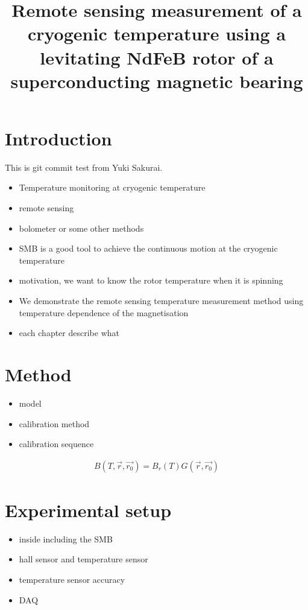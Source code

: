 \documentclass[12pt]{amsart}
\title{Remote sensing measurement of a cryogenic temperature using a levitating NdFeB rotor of a superconducting magnetic bearing}
\author{}
\date{} %
\begin{document}
\maketitle
\tableofcontents

\section{Introduction}
This is git commit test from Yuki Sakurai.
\begin{itemize}
\item Temperature monitoring at cryogenic temperature
\item remote sensing
\item bolometer or some other methods
\item SMB is a good tool to achieve the continuous motion at the cryogenic temperature
\item motivation, we want to know the rotor temperature when it is spinning
\item We demonstrate the remote sensing temperature measurement method using temperature dependence of the magnetisation
\item each chapter describe what
\end{itemize}

\section{Method}

\begin{itemize}
\item model
\item calibration method
\item calibration sequence
\end{itemize}


\begin{eqnarray}
	B(T,\vec{r},\vec{r_0}) = B_r(T) G(\vec{r},\vec{r_0})
\end{eqnarray}

\section{Experimental setup}
\begin{itemize}
\item inside including the SMB
\item hall sensor and temperature sensor
\item temperature sensor accuracy
\item DAQ
\end{itemize}
\end{document}

